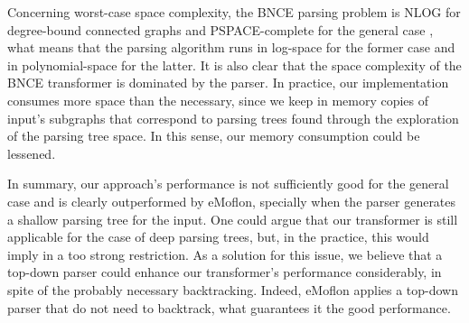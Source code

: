 Concerning worst-case space complexity, the BNCE parsing problem is NLOG for degree-bound connected graphs \cite{kim2001efficient} and PSPACE-complete for the general case \cite{rozenberg1986boundary}, what means that the parsing algorithm runs in log-space for the former case and in polynomial-space for the latter. It is also clear that the space complexity of the BNCE transformer is dominated by the parser. In practice, our implementation consumes more space than the necessary, since we keep in memory copies of input's subgraphs that correspond to parsing trees found through the exploration of the parsing tree space. In this sense, our memory consumption could be lessened.

In summary, our approach's performance is not sufficiently good for the general case and is clearly outperformed by eMoflon, specially when the parser generates a shallow parsing tree for the input. One could argue that our transformer is still applicable for the case of deep parsing trees, but, in the practice, this would imply in a too strong restriction. As a solution for this issue, we believe that a top-down parser could enhance our transformer's performance considerably, in spite of the probably necessary backtracking. Indeed, eMoflon applies a top-down parser that do not need to backtrack, what guarantees it the good performance.